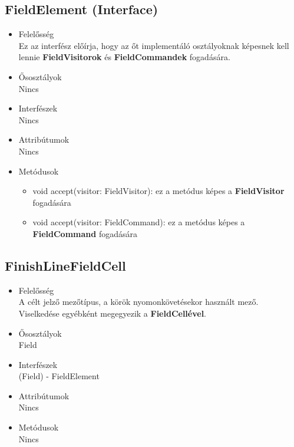 \subsection{FieldElement (Interface)}
\begin{itemize}

\item Felelősség\\
    Ez az interfész előírja, hogy az őt implementáló osztályoknak képesnek kell lennie \textbf{FieldVisitorok} és \textbf{FieldCommandek} fogadására. 

\item Ősosztályok\\
Nincs

\item Interfészek\\
Nincs

\item Attribútumok\\
Nincs

\item Metódusok\\

\begin{itemize}
    \item void accept(visitor: FieldVisitor): ez a metódus képes a \textbf{FieldVisitor} fogadására
    \item void accept(visitor: FieldCommand): ez a metódus képes a \textbf{FieldCommand} fogadására
\end{itemize}

\end{itemize}

\subsection{FinishLineFieldCell}
\begin{itemize}

\item Felelősség\\
    A célt jelző mezőtípus, a körök nyomonkövetésekor használt mező. Viselkedése egyébként megegyezik a \textbf{FieldCellével}.

\item Ősosztályok\\
Field

\item Interfészek\\
(Field) - FieldElement

\item Attribútumok\\
Nincs

\item Metódusok\\
Nincs

\end{itemize}

